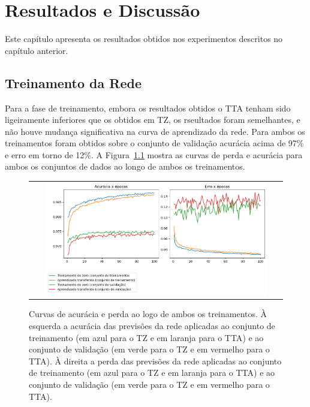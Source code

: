 \chapter[Resultados e Discussão]{Resultados e Discussão}
\label{resultados-e-discussao}

Este capítulo apresenta os resultados obtidos nos experimentos descritos no capítulo anterior.

\section{Treinamento da Rede}

Para a fase de treinamento, embora os resultados obtidos o \acs{TTA} tenham sido ligeiramente inferiores que os obtidos em \acs{TZ}, os rseultados foram semelhantes, e não houve mudança significativa na curva de aprendizado da rede. Para ambos os treinamentos foram obtidos sobre o conjunto de validação acurácia acima de 97\% e erro em torno de 12\%. A Figura~\ref{fig:640-acc-loss} mostra as curvas de perda e acurácia para ambos os conjuntos de dados ao longo de ambos os treinamentos.

\begin{figure}[h]
    \center
    \begin{tabular}{@{}c@{}}
        \includegraphics[width=0.9\textwidth]{figures/4_results/both_training_pt.png}
        \\[\abovecaptionskip]
    \end{tabular}
  
    \caption[Curvas de acurácia e perda ao logo do treinamento.]{Curvas de acurácia e perda ao logo de ambos os treinamentos. À esquerda a acurácia das previsões da rede aplicadas ao conjunto de treinamento (em azul para o \acs{TZ} e em laranja para o \acs{TTA}) e ao conjunto de validação (em verde para o \acs{TZ} e em vermelho para o \acs{TTA}). À direita a perda das previsões da rede aplicadas ao conjunto de treinamento (em azul para o \acs{TZ} e em laranja para o \acs{TTA}) e ao conjunto de validação (em verde para o \acs{TZ} e em vermelho para o \acs{TTA}).}
    \label{fig:640-acc-loss}
\end{figure}

